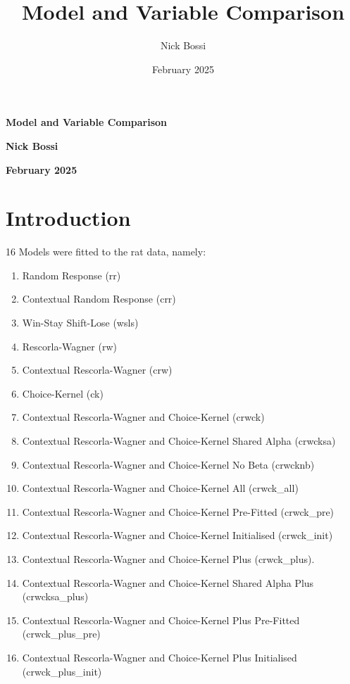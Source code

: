\documentclass[12pt]{article}
\title{Model and Variable Comparison}
\author{Nick Bossi}
\date{February 2025}
\begin{document}
	
\begin{titlepage}
	\begin{center}
		\vspace*{2cm}
		{\LARGE\bfseries Model and Variable Comparison\par}
		\vspace{1cm}
		{\large\bfseries Nick Bossi\par}
		\vspace{0.5cm}
		{\large\bfseries February 2025\par}
		\vspace{2cm}
		
		\tableofcontents
	\end{center}
\end{titlepage}
	
\section{Introduction}
16 Models were fitted to the rat data, namely:
\begin{enumerate}
	\item Random Response (rr)
	\item Contextual Random Response (crr)
	\item Win-Stay Shift-Lose (wsls)
	\item Rescorla-Wagner (rw)
	\item Contextual Rescorla-Wagner (crw)
	\item Choice-Kernel (ck)
	\item Contextual Rescorla-Wagner and Choice-Kernel (crwck)
	\item Contextual Rescorla-Wagner and Choice-Kernel Shared Alpha (crwcksa)
	\item Contextual Rescorla-Wagner and Choice-Kernel No Beta (crwcknb)
	\item Contextual Rescorla-Wagner and Choice-Kernel All (crwck\_all)
	\item Contextual Rescorla-Wagner and Choice-Kernel Pre-Fitted (crwck\_pre)
	\item Contextual Rescorla-Wagner and Choice-Kernel Initialised (crwck\_init)
	\item Contextual Rescorla-Wagner and Choice-Kernel Plus (crwck\_plus).
	\item Contextual Rescorla-Wagner and Choice-Kernel Shared Alpha Plus (crwcksa\_plus)
	\item Contextual Rescorla-Wagner and Choice-Kernel Plus Pre-Fitted (crwck\_plus\_pre)
	\item Contextual Rescorla-Wagner and Choice-Kernel Plus Initialised (crwck\_plus\_init)
\end{enumerate}
\end{document}
